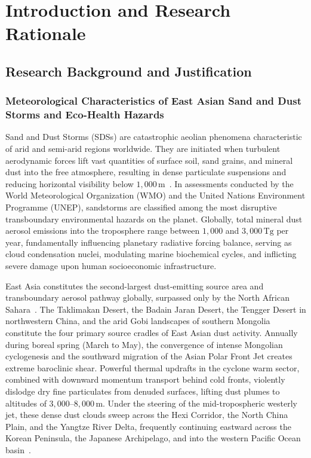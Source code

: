 
\chapter{Introduction and Research Rationale}
\label{chap:introduction}

\section{Research Background and Justification}
\label{sec:background}

\subsection{Meteorological Characteristics of East Asian Sand and Dust Storms and Eco-Health Hazards}
\label{subsec:sds_hazards}

Sand and Dust Storms (SDSs) are catastrophic aeolian phenomena characteristic of arid and semi-arid regions worldwide. They are initiated when turbulent aerodynamic forces lift vast quantities of surface soil, sand grains, and mineral dust into the free atmosphere, resulting in dense particulate suspensions and reducing horizontal visibility below $1{,}000\,\text{m}$~\cite{ref2,zhang2004evolution}. In assessments conducted by the World Meteorological Organization (WMO) and the United Nations Environment Programme (UNEP), sandstorms are classified among the most disruptive transboundary environmental hazards on the planet. Globally, total mineral dust aerosol emissions into the troposphere range between $1{,}000$ and $3{,}000\,\text{Tg}$ per year, fundamentally influencing planetary radiative forcing balance, serving as cloud condensation nuclei, modulating marine biochemical cycles, and inflicting severe damage upon human socioeconomic infrastructure.

East Asia constitutes the second-largest dust-emitting source area and transboundary aerosol pathway globally, surpassed only by the North African Sahara~\cite{ref2,ref3}. The Taklimakan Desert, the Badain Jaran Desert, the Tengger Desert in northwestern China, and the arid Gobi landscapes of southern Mongolia constitute the four primary source cradles of East Asian dust activity. Annually during boreal spring (March to May), the convergence of intense Mongolian cyclogenesis and the southward migration of the Asian Polar Front Jet creates extreme baroclinic shear. Powerful thermal updrafts in the cyclone warm sector, combined with downward momentum transport behind cold fronts, violently dislodge dry fine particulates from denuded surfaces, lifting dust plumes to altitudes of $3{,}000\text{--}8{,}000\,\text{m}$. Under the steering of the mid-tropospheric westerly jet, these dense dust clouds sweep across the Hexi Corridor, the North China Plain, and the Yangtze River Delta, frequently continuing eastward across the Korean Peninsula, the Japanese Archipelago, and into the western Pacific Ocean basin~\cite{ref10,ref16}.

